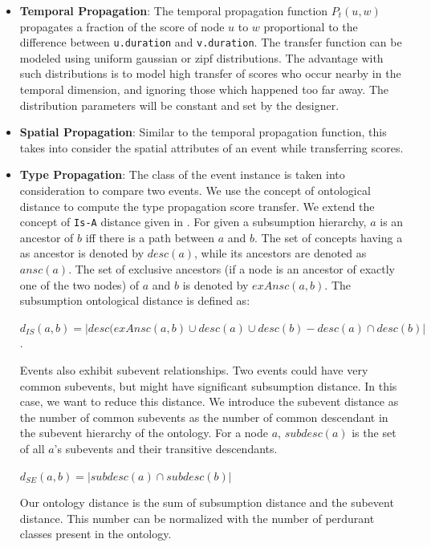 \begin{itemize}
\item \textbf{Temporal Propagation}: The temporal propagation function $P_t (u, w)$ propagates a fraction of the score of node $u$ to $w$ proportional to the difference between \texttt{u.duration} and \texttt{v.duration}. The transfer function can be modeled using uniform gaussian or zipf distributions. The advantage with such distributions is to model high transfer of scores who occur nearby in the temporal dimension, and ignoring those which happened too far away. The distribution parameters will be constant and set by the designer.

\item \textbf{Spatial Propagation}: Similar to the temporal propagation function, this takes into consider the spatial attributes of an event while transferring scores.

\item \textbf{Type Propagation}: The class of the event instance is taken into consideration to compare two events. We use the concept of ontological distance to compute the type propagation score transfer. We extend the concept of \texttt{Is-A} distance given in \cite{ranwez2006ontological}. For given a subsumption hierarchy, $a$ is an ancestor of $b$ iff there is a path between $a$ and $b$. The set of concepts having a as ancestor is denoted by $desc(a)$, while its ancestors are denoted as $ansc(a)$. The set of exclusive ancestors (if a node is an ancestor of exactly one of the two nodes) of $a$ and $b$ is denoted by $exAnsc(a, b)$. The subsumption ontological distance is defined as:

$d_{IS}(a, b) = |desc(exAnsc(a, b) \cup desc(a) \cup desc(b) - desc(a) \cap desc(b)|$.

Events also exhibit subevent relationships. Two events could have very common subevents, but might have significant subsumption distance. In this case, we want to reduce this distance. We introduce the subevent distance as the number of common subevents as the number of common descendant in the subevent hierarchy of the ontology. For a node $a$, $subdesc(a)$ is the set of all $a$'s subevents and their transitive descendants.

$d_{SE}(a, b) = |subdesc(a) \cap subdesc(b)|$

Our ontology distance is the sum of subsumption distance and the subevent distance. This number can be normalized with the number of perdurant classes present in the ontology.


\end{itemize}

